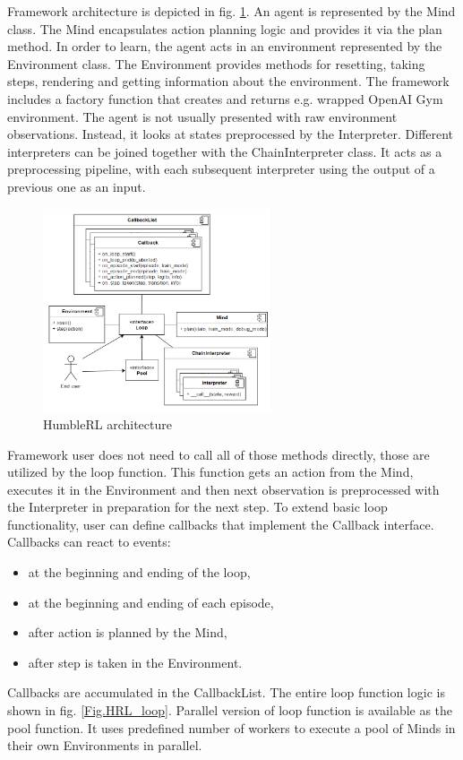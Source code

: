 Framework architecture is depicted in fig. \ref{Fig.HRL_architecture}. An agent is represented by the Mind class. The Mind encapsulates action planning logic and provides it via the plan method. In order to learn, the agent acts in an environment represented by the Environment class. The Environment provides methods for resetting, taking steps, rendering and getting information about the environment. The framework includes a factory function that creates and returns e.g. wrapped OpenAI Gym environment. The agent is not usually presented with raw environment observations. Instead, it looks at states preprocessed by the Interpreter. Different interpreters can be joined together with the ChainInterpreter class. It acts as a preprocessing pipeline, with each subsequent interpreter using the output of a previous one as an input.

\begin{figure}[H]
\includegraphics[width=0.6\textwidth,keepaspectratio]{figures/HumbleRL/architecture.png}
\caption{HumbleRL architecture}
\label{Fig.HRL_architecture}
\end{figure}

Framework user does not need to call all of those methods directly, those are utilized by the loop function. This function gets an action from the Mind, executes it in the Environment and then next observation is preprocessed with the Interpreter in preparation for the next step. To extend basic loop functionality, user can define callbacks that implement the Callback interface. Callbacks can react to events:
\begin{itemize}
\item at the beginning and ending of the loop,
\item at the beginning and ending of each episode,
\item after action is planned by the Mind,
\item after step is taken in the Environment.
\end{itemize}
Callbacks are accumulated in the CallbackList. The entire loop function logic is shown in fig. \ref{Fig.HRL_loop}.
Parallel version of loop function is available as the pool function. It uses predefined number of workers to execute a pool of Minds in their own Environments in parallel.

